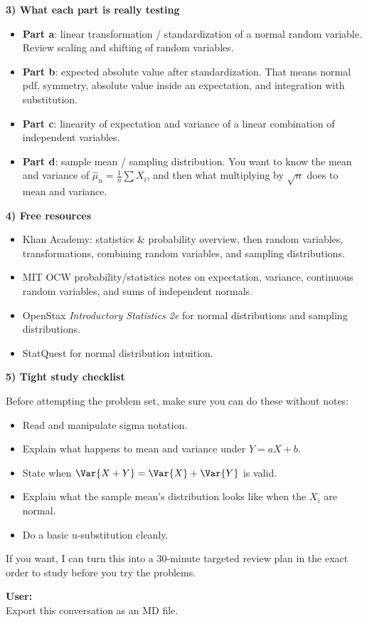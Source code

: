 \documentclass{article}
\begin{document}
\begin{mdframed}
\textbf{3) What each part is really testing}
\begin{itemize}[leftmargin=*]
    \item \textbf{Part a}: linear transformation / standardization of a normal random variable. Review scaling and shifting of random variables.
    \item \textbf{Part b}: expected absolute value after standardization. That means normal pdf, symmetry, absolute value inside an expectation, and integration with substitution.
    \item \textbf{Part c}: linearity of expectation and variance of a linear combination of independent variables.
    \item \textbf{Part d}: sample mean / sampling distribution. You want to know the mean and variance of $\widehat{\mu}_n = \frac{1}{n}\sum X_i$, and then what multiplying by $\sqrt{n}$ does to mean and variance.
\end{itemize}

\textbf{4) Free resources}
\begin{itemize}[leftmargin=*]
    \item Khan Academy: statistics \& probability overview, then random variables, transformations, combining random variables, and sampling distributions.
    \item MIT OCW probability/statistics notes on expectation, variance, continuous random variables, and sums of independent normals.
    \item OpenStax \textit{Introductory Statistics 2e} for normal distributions and sampling distributions.
    \item StatQuest for normal distribution intuition.
\end{itemize}

\textbf{5) Tight study checklist}

Before attempting the problem set, make sure you can do these without notes:
\begin{itemize}[leftmargin=*]
    \item Read and manipulate sigma notation.
    \item Explain what happens to mean and variance under $Y = aX + b$.
    \item State when $\Var{X+Y} = \Var{X} + \Var{Y}$ is valid.
    \item Explain what the sample mean's distribution looks like when the $X_i$ are normal.
    \item Do a basic u-substitution cleanly.
\end{itemize}

If you want, I can turn this into a 30-minute targeted review plan in the exact order to study before you try the problems.

\bigskip
\textbf{User:} \\
Export this conversation as an MD file.
\end{mdframed}
\end{document}
